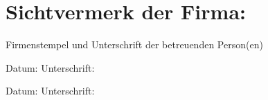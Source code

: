 \chapter*{Sichtvermerk der Firma:}
\label{ch:erklaerung}

\begin{flushleft}
	Firmenstempel und Unterschrift der betreuenden Person(en)
\end{flushleft}
\vspace{1cm}
\begin{flushleft}
	Datum:	\hrulefill\enspace Unterschrift: \hrulefill
\end{flushleft}
\vspace{.5cm}
\begin{flushleft}
	Datum:	\hrulefill\enspace Unterschrift: \hrulefill
\end{flushleft}

	